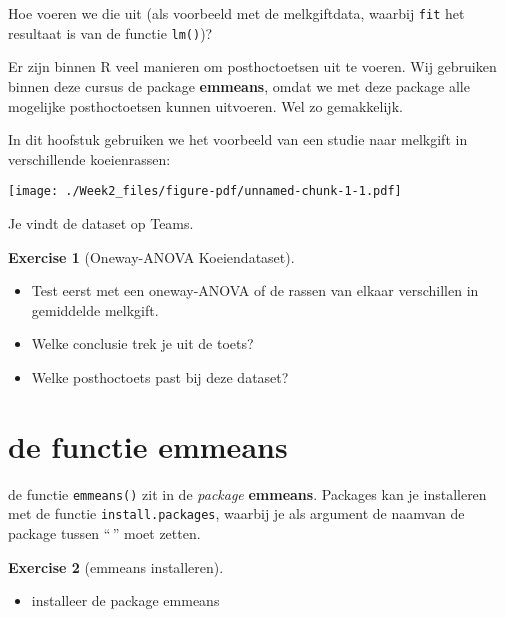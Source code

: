 \documentclass[
  letterpaper,
  DIV=11,
  numbers=noendperiod]{scrreprt}
\providecommand{\tightlist}{%
  \setlength{\itemsep}{0pt}\setlength{\parskip}{0pt}}\usepackage{longtable,booktabs,array}
\theoremstyle{definition}
\newtheorem{exercise}{Exercise}[chapter]
\theoremstyle{remark}
\begin{document}
Hoe voeren we die uit (als voorbeeld met de melkgiftdata, waarbij
\texttt{fit} het resultaat is van de functie \texttt{lm()})?

Er zijn binnen R veel manieren om posthoctoetsen uit te voeren. Wij
gebruiken binnen deze cursus de package \textbf{emmeans}, omdat we met
deze package alle mogelijke posthoctoetsen kunnen uitvoeren. Wel zo
gemakkelijk.

In dit hoofstuk gebruiken we het voorbeeld van een studie naar melkgift
in verschillende koeienrassen:

\texttt{[image: ./Week2\_files/figure-pdf/unnamed-chunk-1-1.pdf]}

Je vindt de dataset op Teams.

\leavevmode{}%
\begin{exercise}[Oneway-ANOVA Koeiendataset]\label{exr-koeien}

\begin{itemize}
\tightlist
\item
  Test eerst met een oneway-ANOVA of de rassen van elkaar verschillen in
  gemiddelde melkgift.
\item
  Welke conclusie trek je uit de toets?
\item
  Welke posthoctoets past bij deze dataset?
\end{itemize}

\end{exercise}

\hypertarget{de-functie-emmeans}{%
\section{de functie emmeans}\label{de-functie-emmeans}}

de functie \texttt{emmeans()} zit in de \emph{package} \textbf{emmeans}.
Packages kan je installeren met de functie \texttt{install.packages},
waarbij je als argument de naamvan de package tussen ``\,'' moet zetten.

\leavevmode{}%
\begin{exercise}[emmeans installeren]\label{exr-installemmeans}

\begin{itemize}
\tightlist
\item
  installeer de package emmeans
\end{itemize}

\end{exercise}
\end{document}
